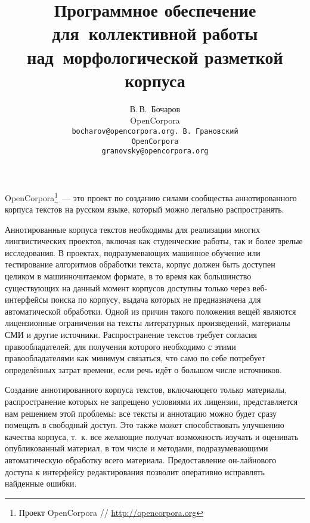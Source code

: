 \documentclass[a4paper]{article}
\begin{document}
\author{В.\,В.~Бочаров\\\small OpenCorpora\\\small\tt bocharov@opencorpora.org.\,В.~Грановский\\\small OpenCorpora\\\small\tt granovsky@opencorpora.org}
\title{Программное обеспечение для~коллективной работы над~морфологической разметкой корпуса}
\date{}
\maketitle
OpenCorpora\footnote{Проект OpenCorpora // \url{http://opencorpora.org}}~--- это проект по созданию силами сообщества аннотированного корпуса текстов на русском языке, который можно легально распространять.

Аннотированные корпуса текстов необходимы для реализации многих лингвистических проектов, включая как студенческие работы, так и более зрелые исследования. В проектах, подразумевающих машинное обучение или тестирование алгоритмов обработки текста, корпус должен быть доступен целиком в машинночитаемом формате, в то время как большинство существующих на данный момент корпусов доступны только через веб-интерфейсы поиска по корпусу, выдача которых не предназначена для автоматической обработки. Одной из причин такого положения вещей являются лицензионные ограничения на тексты литературных произведений, материалы СМИ и другие источники. Распространение текстов требует согласия правообладателей, для получения которого необходимо с этими правообладателями как минимум связаться, что само по себе потребует определённых затрат времени, если речь идёт о большом числе источников.

Создание аннотированного корпуса текстов, включающего только материалы, распространение которых не запрещено условиями их лицензии, представляется нам решением этой проблемы: все тексты и аннотацию можно будет сразу помещать в свободный доступ. Это также может способствовать улучшению качества корпуса, т.~к. все желающие получат возможность изучать и оценивать опубликованный материал, в том числе и методами, подразумевающими автоматическую обработку всего материала. Предоставление он-лайнового доступа к интерфейсу редактирования позволит оперативно исправлять найденные ошибки.
\end{document}
